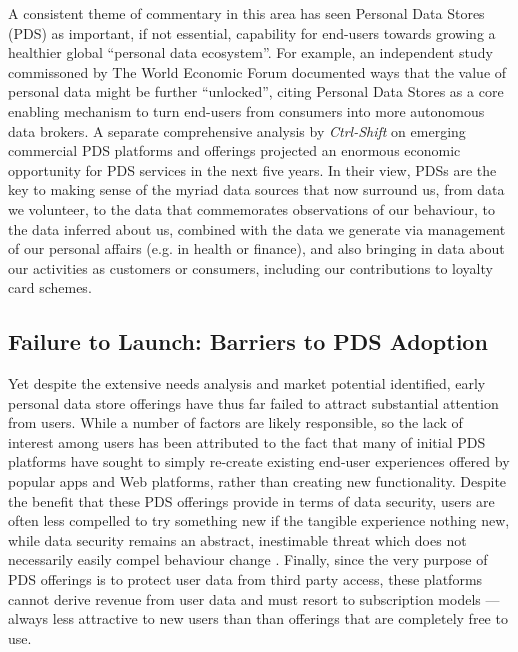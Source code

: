 \documentclass{acm_proc_article-sp}
\begin{document}

A consistent theme of commentary in this area has seen Personal Data Stores (PDS) as important, if not essential, capability for end-users towards growing a healthier global ``personal data ecosystem''.  For example, an independent study commissoned by The World Economic Forum documented ways that the value of personal data might be further ``unlocked'', citing Personal Data Stores as a core enabling mechanism to turn end-users from consumers into more autonomous data brokers\cite{WEF-report}.  A separate comprehensive analysis by \emph{Ctrl-Shift} on emerging commercial PDS platforms and offerings projected an enormous economic opportunity for PDS services in the next five years\cite{ctrlshift}. In their view, PDSs are the key to making sense of the myriad data sources that now surround us, from data we volunteer, to the data that commemorates observations of our behaviour, to the data inferred about us, combined with the data we generate via management of our personal affairs (e.g. in health or finance), and also bringing in data about our activities as customers or consumers, including our contributions to loyalty card schemes.

\subsection{Failure to Launch: Barriers to PDS Adoption}

Yet despite the extensive needs analysis and market potential identified, early personal data store offerings have thus far failed to attract substantial attention from users.  While a number of factors are likely responsible, so the lack of interest among users has been attributed to the fact that many of initial PDS platforms have sought to simply re-create existing end-user experiences offered by popular apps and Web platforms, rather than creating new functionality.  Despite the benefit that these PDS offerings provide in terms of data security, users are often less compelled to try something new if the tangible experience nothing new, while data security remains an abstract, inestimable threat which does not necessarily easily compel behaviour change \cite{bandura1977self}.  Finally, since the very purpose of PDS offerings is to protect user data from third party access, these platforms cannot derive revenue from user data and must resort to subscription models --- always less attractive to new users than than offerings that are completely free to use. 
\end{document}
